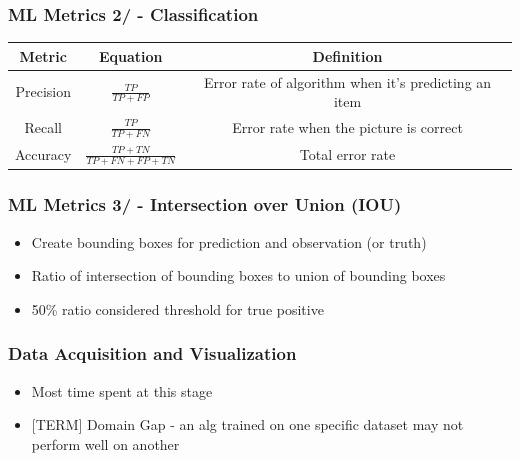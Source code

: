 \documentclass[11pt,xcolor={dvipsnames},usepdftitle=false]{beamer}
\begin{document}
\begin{frame}
  \frametitle{ML Metrics 2/ - Classification}
  \begin{table}
    \begin{tabular}{| c | c | c |}
      \hline
      \small {\textbf{Metric}} & {\textbf{Equation}} & {\textbf{Definition}}  \\\hline
      \small Precision   & $\frac{TP}{TP+FP} $ & Error rate of algorithm when it's predicting an item \\\hline
      \small Recall   & $\frac{TP}{TP+FN} $ & Error rate when the picture is correct  \\\hline
      \small Accuracy   & $\frac{TP+TN}{TP+FN+FP+TN} $ & Total error rate\\\hline
    \end{tabular}
  \end{table}

\end{frame}

\begin{frame}
  \frametitle{ML Metrics 3/ - Intersection over Union (IOU)}

  \begin{itemize}
    \small\item Create bounding boxes for prediction and observation (or truth)
    \small\item Ratio of intersection of bounding boxes to union of bounding boxes
    \small\item 50\% ratio considered threshold for true positive
  \end{itemize}

\end{frame}


\begin{frame}
  \frametitle{Data Acquisition and Visualization}

  \begin{itemize}
    \small\item Most time spent at this stage
    \small\item $[$TERM$]$ Domain Gap - an alg trained on one specific dataset may not perform well on another
  \end{itemize}

\end{frame}
\end{document}
